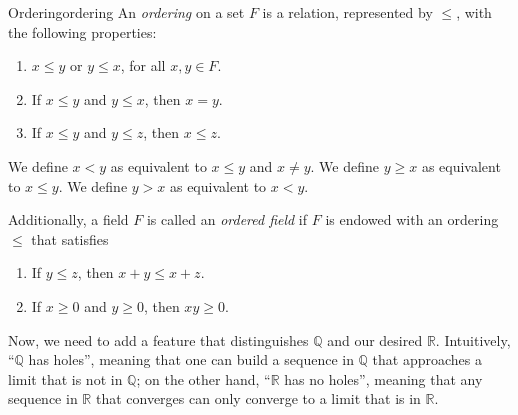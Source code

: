 \begin{defn}{Ordering}{ordering}
	An \emph{ordering} on a set \(F\) is a relation, represented by \(\leq\), with the following properties:
	\begin{enumerate}
		\item \(x \leq y\) or \(y \leq x\), for all \(x, y \in F\).
		\item If \(x \leq y\) and \(y \leq x\), then \(x = y\).
		\item If \(x \leq y\) and \(y \leq z\), then \(x \leq z\).
	\end{enumerate}

	We define \(x < y\) as equivalent to \(x \leq y\) and \(x \neq y\).
	We define \(y \geq x\) as equivalent to \(x \leq y\).
	We define \(y > x\) as equivalent to \(x < y\).

	Additionally, a field \(F\) is called an \emph{ordered field} if \(F\) is endowed with an ordering \(\leq\) that satisfies
	\begin{enumerate}[resume]
		\item If \(y \leq z\), then \(x + y \leq x + z\).
		\item If \(x \geq 0\) and \(y \geq 0\), then \(xy \geq 0\).
	\end{enumerate}
\end{defn}

Now, we need to add a feature that distinguishes \(\mathbb{Q}\) and our desired \(\mathbb{R}\).
Intuitively, ``\(\mathbb{Q}\) has holes'', meaning that one can build a sequence in \(\mathbb{Q}\) that approaches a limit that is not in \(\mathbb{Q}\); on the other hand, ``\(\mathbb{R}\) has no holes'', meaning that any sequence in \(\mathbb{R}\) that converges can only converge to a limit that is in \(\mathbb{R}\).

